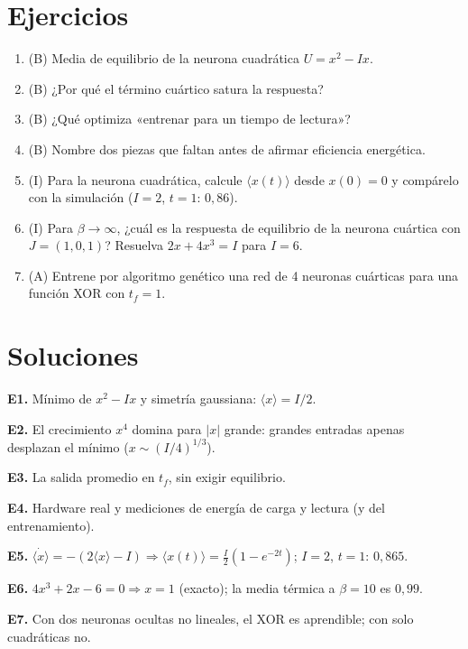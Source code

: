 \documentclass[11pt,a4paper]{article}
\begin{document}
\section{Ejercicios}
\begin{enumerate}[label=\textbf{E\arabic*.}]
\item (B) Media de equilibrio de la neurona cuadrática $U=x^2-Ix$.
\item (B) ¿Por qué el término cuártico satura la respuesta?
\item (B) ¿Qué optimiza «entrenar para un tiempo de lectura»?
\item (B) Nombre dos piezas que faltan antes de afirmar eficiencia energética.
\item (I) Para la neurona cuadrática, calcule $\langle x(t)\rangle$ desde $x(0)=0$ y compárelo con la simulación ($I=2$, $t=1$: $0{,}86$).
\item (I) Para $\beta\to\infty$, ¿cuál es la respuesta de equilibrio de la neurona cuártica con $J=(1,0,1)$? Resuelva $2x+4x^3=I$ para $I=6$.
\item (A) Entrene por algoritmo genético una red de 4 neuronas cuárticas para una función XOR con $t_f=1$.
\end{enumerate}
\section{Soluciones}
\begin{solucion}
\textbf{E1.} Mínimo de $x^2-Ix$ y simetría gaussiana: $\langle x\rangle=I/2$.

\textbf{E2.} El crecimiento $x^4$ domina para $|x|$ grande: grandes entradas apenas desplazan el mínimo ($x\sim(I/4)^{1/3}$).

\textbf{E3.} La salida promedio en $t_f$, sin exigir equilibrio.

\textbf{E4.} Hardware real y mediciones de energía de carga y lectura (y del entrenamiento).

\textbf{E5.} $\dot{\langle x\rangle}=-(2\langle x\rangle-I)\Rightarrow\langle x(t)\rangle=\frac I2(1-e^{-2t})$; $I=2$, $t=1$: $0{,}865$.

\textbf{E6.} $4x^3+2x-6=0\Rightarrow x=1$ (exacto); la media térmica a $\beta=10$ es $0{,}99$.

\textbf{E7.} Con dos neuronas ocultas no lineales, el XOR es aprendible; con solo cuadráticas no.
\end{solucion}
\end{document}
